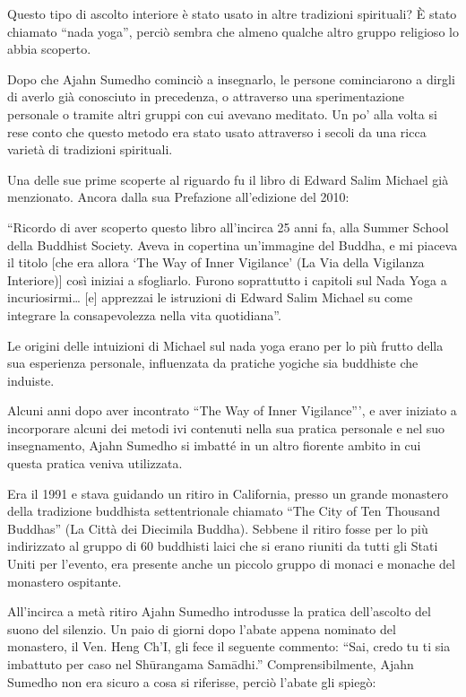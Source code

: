 \clearpage

Questo tipo di ascolto interiore è stato usato in altre tradizioni
spirituali? È stato chiamato ``nada yoga'', perciò sembra che almeno
qualche altro gruppo religioso lo abbia scoperto.

Dopo che Ajahn Sumedho cominciò a insegnarlo, le persone
cominciarono a dirgli di averlo già conosciuto in precedenza, o
attraverso una sperimentazione personale o tramite altri gruppi con cui
avevano meditato. Un po' alla volta si rese conto che questo metodo era
stato usato attraverso i secoli da una ricca varietà di tradizioni
spirituali.

Una delle sue prime scoperte al riguardo fu il libro di Edward Salim
Michael già menzionato. Ancora dalla sua Prefazione all'edizione del
2010:

``Ricordo di aver scoperto questo libro all'incirca 25 anni fa, alla Summer
School della Buddhist Society. Aveva in copertina un'immagine del Buddha, e mi
piaceva il titolo [che era allora `The Way of Inner Vigilance' (La Via della
Vigilanza Interiore)] così iniziai a sfogliarlo. Furono soprattutto i capitoli
sul Nada Yoga a incuriosirmi\ldots{} [e] apprezzai le istruzioni di Edward Salim
Michael su come integrare la consapevolezza nella vita quotidiana''.

Le origini delle intuizioni di Michael sul nada yoga erano per lo più
frutto della sua esperienza personale, influenzata da pratiche yogiche
sia buddhiste che induiste.

Alcuni anni dopo aver incontrato ``The Way of Inner Vigilance''', e aver
iniziato a incorporare alcuni dei metodi ivi contenuti nella sua pratica
personale e nel suo insegnamento, Ajahn Sumedho si imbatté in un altro
fiorente ambito in cui questa pratica veniva utilizzata.

Era il 1991 e stava guidando un ritiro in California, presso un grande
monastero della tradizione buddhista settentrionale chiamato ``The City
of Ten Thousand Buddhas'' (La Città dei Diecimila Buddha). Sebbene il
ritiro fosse per lo più indirizzato al gruppo di 60 buddhisti laici che
si erano riuniti da tutti gli Stati Uniti per l'evento, era presente
anche un piccolo gruppo di monaci e monache del monastero ospitante.

All'incirca a metà ritiro Ajahn Sumedho introdusse la pratica
dell'ascolto del suono del silenzio. Un paio di giorni dopo l'abate
appena nominato del monastero, il Ven. Heng Ch'I, gli fece il seguente
commento: ``Sai, credo tu ti sia imbattuto per caso nel Shūrangama
Samādhi.'' Comprensibilmente, Ajahn Sumedho non era sicuro a cosa si
riferisse, perciò l'abate gli spiegò:

